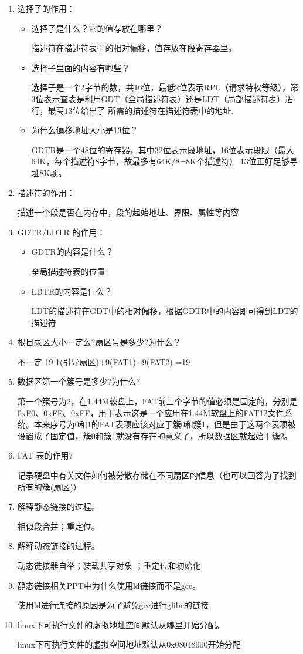 \documentclass[a4paper]{article}
\begin{document}
\begin{enumerate}
	\item 选择子的作用：
		\begin{itemize}
			\item 选择子是什么？它的值存放在哪里？
			
			描述符在描述符表中的相对偏移，值存放在段寄存器里。
			\item 选择子里面的内容有哪些？
			
			选择子是一个2字节的数，共16位，最低2位表示RPL（请求特权等级），第3位表示查表是利用GDT（全局描述符表）还是LDT（局部描述符表）进行，最高13位给出了 所需的描述符在描述符表中的地址.
			\item 为什么偏移地址大小是13位？
			
			GDTR是一个48位的寄存器，其中32位表示段地址，16位表示段限（最大 64K，每个描述符8字节，故最多有64K/8=8K个描述符）
13位正好足够寻址8K项。
		\end{itemize}
	\item 描述符的作用：
	
	描述一个段是否在内存中，段的起始地址、界限、属性等内容
	\item GDTR/LDTR 的作用：
		\begin{itemize}
			\item GDTR的内容是什么？
			
			全局描述符表的位置
			\item LDTR的内容是什么？
			
			LDT的描述符在GDT中的相对偏移，根据GDTR中的内容即可得到LDT的描述符
		\end{itemize}
	\item 根目录区大小一定么?扇区号是多少?为什么？
	
	不一定  19  1(引导扇区)+9(FAT1)+9(FAT2) =19
	\item 数据区第一个簇号是多少?为什么?
	
	第一个簇号为2，在1.44M软盘上，FAT前三个字节的值必须是固定的，分别是0xF0、0xFF、0xFF，用于表示这是一个应用在1.44M软盘上的FAT12文件系统。本来序号为0和1的FAT表项应该对应于簇0和簇1，但是由于这两个表项被设置成了固定值，簇0和簇1就没有存在的意义了，所以数据区就起始于簇2。
	\item FAT 表的作用?
	
	记录硬盘中有关文件如何被分散存储在不同扇区的信息（也可以回答为了找到所有的簇(扇区)）
	\item 解释静态链接的过程。
	
	相似段合并；重定位。	
	\item 解释动态链接的过程。
	
	动态链接器自举；装载共享对象 ；重定位和初始化 
	\item 静态链接相关PPT中为什么使用ld链接而不是gcc。
	
	使用ld进行连接的原因是为了避免gcc进行glibc的链接
	\item linux下可执行文件的虚拟地址空间默认从哪里开始分配。
	
	linux下可执行文件的虚拟空间地址默认从0x08048000开始分配
\end{enumerate}
\end{document}
